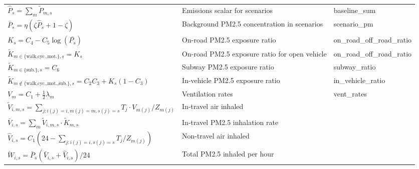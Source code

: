 \documentclass{article}
\begin{document}
\begin{appendix}
\begin{landscape}
\begin{center}
\begin{ThreePartTable}
\begin{longtable}{lp{7cm}p{5cm}}
$\hat{P}_{s}=\sum_{m} \tilde{P}_{m,s}$ & Emissions scalar for scenarios & baseline\_sum \\[5pt]
$\bar{P}_s=\eta(\zeta\hat{P}_s + 1-\zeta)$ & Background PM2.5 concentration in scenarios &   scenario\_pm  \\[5pt]
\hline 
\hline 
$K_s=C_4-C_5\log(\bar{P_s})$ & On-road PM2.5 exposure ratio  & on\_road\_off\_road\_ratio \\[5pt]
$\tilde{K}_{m\in\{\text{walk,cyc.,mot.}\},s}=K_s$ & On-road PM2.5 exposure ratio for open vehicle  & on\_road\_off\_road\_ratio  \\[5pt]
$\tilde{K}_{m\in\{\text{sub.}\},s}=C_6$ & Subway PM2.5 exposure ratio   & subway\_ratio  \\[5pt]
$\tilde{K}_{m\not\in\{\text{walk,cyc.,mot.,sub.}\},s}=C_2C_3+K_s(1-C_3)$ & In-vehicle PM2.5 exposure ratio  & in\_vehicle\_ratio  \\[5pt]
\hline
\hline 
$V_m=C_1+\frac{1}{2}\lambda_m$ & Ventilation rates &   vent\_rates \\[5pt] 
$\tilde{V}_{i,m,s} = \sum_{j:i(j)=i,m(j)=m,s(j)=s}T_j\cdot V_{m(j)}/Z_{m(j)}$ & In-travel air inhaled &   \\[5pt]
$\bar{V}_{i,s} = \sum_{m}\tilde{V}_{i,m,s}\cdot \tilde{K}_{m,s}$ & In-travel PM2.5 inhalation rate &   \\[5pt]
$\hat{V}_{i,s} = C_1\left(24-\sum_{j:i(j)=i,s(j)=s}T_j/Z_{m(j)}\right)$ & Non-travel air inhaled &   \\[5pt]
$\check{W}_{i,s} = \bar{P}_s(\bar{V}_{i,s}+\hat{V}_{i,s})/24
$ & Total PM2.5 inhaled per hour  &  \\[5pt]



\end{longtable}
\end{ThreePartTable}
\end{center}
\end{landscape}
\end{appendix}
\end{document}

